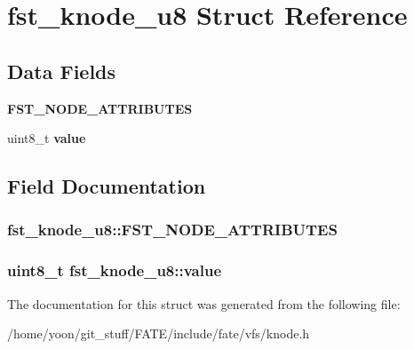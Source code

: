 \hypertarget{structfst__knode__u8}{\section{fst\-\_\-knode\-\_\-u8 Struct Reference}
\label{structfst__knode__u8}
}
\subsection*{Data Fields}
\begin{DoxyCompactItemize}
\item 
\hypertarget{structfst__knode__u8_ac224f11987b0493783e761daed96ed26}{{\bfseries F\-S\-T\-\_\-\-N\-O\-D\-E\-\_\-\-A\-T\-T\-R\-I\-B\-U\-T\-E\-S}}\label{structfst__knode__u8_ac224f11987b0493783e761daed96ed26}

\item 
\hypertarget{structfst__knode__u8_a0fd06a6736e6b82a1a3b5a99ed8e222c}{uint8\-\_\-t {\bfseries value}}\label{structfst__knode__u8_a0fd06a6736e6b82a1a3b5a99ed8e222c}

\end{DoxyCompactItemize}


\subsection{Field Documentation}
\hypertarget{structfst__knode__u8_ac224f11987b0493783e761daed96ed26}{
\subsubsection[{F\-S\-T\-\_\-\-N\-O\-D\-E\-\_\-\-A\-T\-T\-R\-I\-B\-U\-T\-E\-S}]{\setlength{\rightskip}{0pt plus 5cm}fst\-\_\-knode\-\_\-u8\-::\-F\-S\-T\-\_\-\-N\-O\-D\-E\-\_\-\-A\-T\-T\-R\-I\-B\-U\-T\-E\-S}}\label{structfst__knode__u8_ac224f11987b0493783e761daed96ed26}
\hypertarget{structfst__knode__u8_a0fd06a6736e6b82a1a3b5a99ed8e222c}{
\subsubsection[{value}]{\setlength{\rightskip}{0pt plus 5cm}uint8\-\_\-t fst\-\_\-knode\-\_\-u8\-::value}}\label{structfst__knode__u8_a0fd06a6736e6b82a1a3b5a99ed8e222c}


The documentation for this struct was generated from the following file\-:\begin{DoxyCompactItemize}
\item 
/home/yoon/git\-\_\-stuff/\-F\-A\-T\-E/include/fate/vfs/knode.\-h\end{DoxyCompactItemize}
